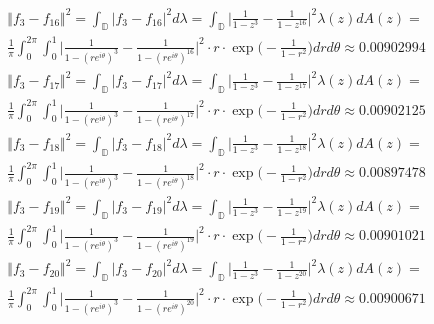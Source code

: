 \documentclass[12pt]{article}
\begin{document}
\begin{align}
& \Vert f_3 - f_{16} \Vert^2 = \int_\mathbb{D} \vert f_3 - f_{16} \vert^2 d\lambda = \int_\mathbb{D} \bigg\vert \frac{1}{1-z^3} - \frac{1}{1-z^{16}} \bigg\vert^2 \lambda(z) dA(z) = \\
& \frac{1}{\pi} \int_0^{2\pi} \int_0^1 \bigg \vert \frac{1}{1-(re^{i\theta})^3} - \frac{1}{1-(re^{i\theta})^{16}} \bigg \vert^2 \cdot r \cdot \exp\bigg(-\frac{1}{1-r^2}\bigg)dr d\theta \approx  0.00902994\\
& \Vert f_3 - f_{17} \Vert^2 = \int_\mathbb{D} \vert f_3 - f_{17} \vert^2 d\lambda = \int_\mathbb{D} \bigg\vert \frac{1}{1-z^3} - \frac{1}{1-z^{17}} \bigg\vert^2 \lambda(z) dA(z) = \\
& \frac{1}{\pi} \int_0^{2\pi} \int_0^1 \bigg \vert \frac{1}{1-(re^{i\theta})^3} - \frac{1}{1-(re^{i\theta})^{17}} \bigg \vert^2 \cdot r \cdot \exp\bigg(-\frac{1}{1-r^2}\bigg)dr d\theta \approx 0.00902125\\
& \Vert f_3 - f_{18} \Vert^2 = \int_\mathbb{D} \vert f_3 - f_{18} \vert^2 d\lambda = \int_\mathbb{D} \bigg\vert \frac{1}{1-z^3} - \frac{1}{1-z^{18}} \bigg\vert^2 \lambda(z) dA(z) = \\
& \frac{1}{\pi} \int_0^{2\pi} \int_0^1 \bigg \vert \frac{1}{1-(re^{i\theta})^3} - \frac{1}{1-(re^{i\theta})^{18}} \bigg \vert^2 \cdot r \cdot \exp\bigg(-\frac{1}{1-r^2}\bigg)dr d\theta \approx 0.00897478\\
& \Vert f_3 - f_{19} \Vert^2 = \int_\mathbb{D} \vert f_3 - f_{19} \vert^2 d\lambda = \int_\mathbb{D} \bigg\vert \frac{1}{1-z^3} - \frac{1}{1-z^{19}} \bigg\vert^2 \lambda(z) dA(z) = \\
& \frac{1}{\pi} \int_0^{2\pi} \int_0^1 \bigg \vert \frac{1}{1-(re^{i\theta})^3} - \frac{1}{1-(re^{i\theta})^{19}} \bigg \vert^2 \cdot r \cdot \exp\bigg(-\frac{1}{1-r^2}\bigg)dr d\theta \approx 0.00901021\\
& \Vert f_3 - f_{20} \Vert^2 = \int_\mathbb{D} \vert f_3 - f_{20} \vert^2 d\lambda = \int_\mathbb{D} \bigg\vert \frac{1}{1-z^3} - \frac{1}{1-z^{20}} \bigg\vert^2 \lambda(z) dA(z) = \\
& \frac{1}{\pi} \int_0^{2\pi} \int_0^1 \bigg \vert \frac{1}{1-(re^{i\theta})^3} - \frac{1}{1-(re^{i\theta})^{20}} \bigg \vert^2 \cdot r \cdot \exp\bigg(-\frac{1}{1-r^2}\bigg)dr d\theta \approx 0.00900671\\
\end{align}
\end{document}
